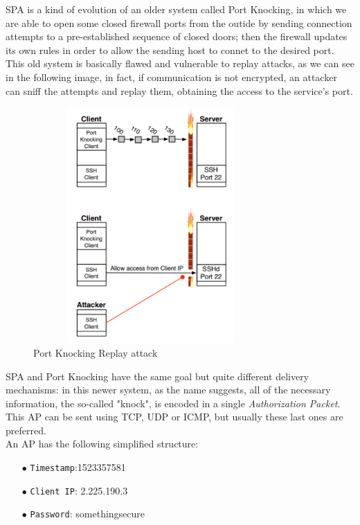 \documentclass[12pt]{report}
\begin{document}
{SPA is a kind of evolution of an older system called Port Knocking, in which we are able to  open some closed firewall ports from the outide by sending connection attempts to a pre-established sequence of closed doors; then the firewall updates its own rules in order to allow the sending host to connet to the desired port.\\
This old system is basically flawed and vulnerable to replay attacks, as we can see in the following image, in fact, if communication is not encrypted, an attacker can sniff the attempts and replay them, obtaining the access to the service's port.\\

\begin{figure}[H]
\includegraphics[width=9cm,height=9cm,keepaspectratio]{port_knocking}
\centering
\caption{Port Knocking Replay attack}
\end{figure}

SPA and Port Knocking have the same goal but quite different delivery mechanisms: in this newer system, as the name suggests, all of the necessary information, the so-called "knock", is encoded in a single \emph{Authorization Packet}.\\
This AP can be sent using TCP, UDP or ICMP, but usually these last ones are preferred.\\
An AP has the following simplified structure:

\begin{itemize}
\setlength{\itemindent}{+4mm}
\item[$\bullet$] \texttt{Timestamp}:1523357581
\item[$\bullet$] \texttt{Client IP}: 2.225.190.3
\item[$\bullet$] \texttt{Password}: somethingsecure
\end{itemize}

}
\end{document}
